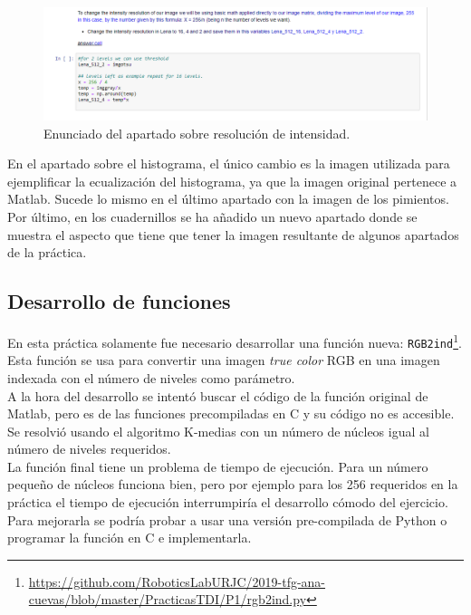 \begin{figure}[h]
\centering
\includegraphics[width=1\textwidth]{imagenes/resolucionmatematica}
\caption{Enunciado del apartado sobre resolución de intensidad.}
\label{resmatematica}
\end{figure}

En el apartado sobre el histograma, el único cambio es la imagen utilizada para ejemplificar la ecualización del histograma, ya que la imagen original pertenece a Matlab. Sucede lo mismo en el último apartado con la imagen de los pimientos.\\

Por último, en los cuadernillos se ha añadido un nuevo apartado donde se muestra el aspecto que tiene que tener la imagen resultante de algunos apartados de la práctica.

\subsection{Desarrollo de funciones}

En esta práctica solamente fue necesario desarrollar una función nueva: \texttt{RGB2ind}\footnote{\url{https://github.com/RoboticsLabURJC/2019-tfg-ana-cuevas/blob/master/PracticasTDI/P1/rgb2ind.py}}. Esta función se usa para convertir una imagen \emph{true color} RGB en una imagen indexada con el número de niveles como parámetro. \\

A la hora del desarrollo se intentó buscar el código de la función original de Matlab, pero es de las funciones precompiladas en C y su código no es accesible. Se resolvió usando el algoritmo K-medias con un número de núcleos igual al número de niveles requeridos.\\

 La función final tiene un problema de tiempo de ejecución. Para un número pequeño de núcleos funciona bien, pero por ejemplo para los 256 requeridos en la práctica el tiempo de ejecución interrumpiría el desarrollo cómodo del ejercicio. Para mejorarla se podría probar a usar una versión pre-compilada de Python o programar la función en C e implementarla.\\

